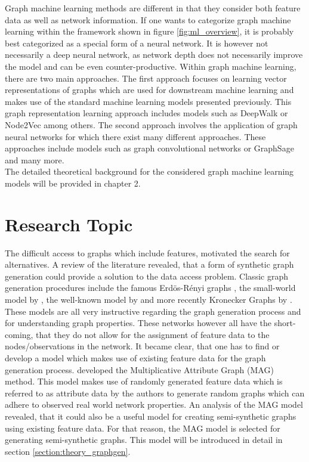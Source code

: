 	\noindent Graph machine learning methods are different in that they consider 
	both feature data as well as network information. If one wants to categorize 
	graph machine learning within the framework shown in figure 
	\ref{fig:ml_overview}, it is probably best categorized as a special form of 
	a neural network. It is however not necessarily a deep neural network, as 
	network depth does not necessarily improve the model and can be even 
	counter-productive. Within graph machine learning, there are two main
	approaches. The first approach focuses on learning vector representations
	of graphs which are used for downstream machine learning and makes use of
	the standard machine learning models presented previously. This graph
	representation learning approach includes models such as DeepWalk 
	\citep{perozzi2014deepwalk} or Node2Vec \citep{grover2016node2vec} among 
	others. The second approach involves the application of graph neural 
	networks for which there exist many different approaches. These approaches 
	include models such as graph convolutional networks \citep{kipf2016semi} or 
	GraphSage \citep{hamilton2017inductive} and many more. \\

	\noindent The detailed theoretical background for the considered graph
	machine learning models will be provided in chapter 2.

	\section{Research Topic}
	\label{section:research_topics}

	\noindent The difficult access to graphs which include features, motivated 
	the search for alternatives. A review of the literature revealed, that a 
	form of synthetic graph generation could provide a solution to the data 
	access problem. Classic graph generation procedures include the famous 
	Erdös-Rényi graphs \citeyearpar{erdos1959random}, the small-world model by 
	\cite{watts1998collective}, the well-known model by 
	\cite{barabasi1999emergence} and more recently Kronecker Graphs by
	\cite{leskovec2010kronecker}. These models are all very instructive
	regarding the graph generation process and for understanding graph
	properties. These networks however all have the short-coming, that they do 
	not allow for the assignment of feature data to the nodes/observations in the
	network. It became clear, that one has to find or develop a model which 
	makes use of existing feature data for the graph generation process. 
	\cite{kim2012multiplicative} developed the Multiplicative Attribute 
	Graph (MAG) method. This model makes use of randomly generated feature data 
	which is referred to as attribute data by the authors to generate random 
	graphs which can adhere to observed real world network properties. An 
	analysis of the MAG model revealed, that it could also be a useful model 
	for creating semi-synthetic graphs using existing feature data. For that
	reason, the MAG model is selected for generating semi-synthetic graphs.
	This model will be introduced in detail in section
	\ref{section:theory_graphgen}. \\

